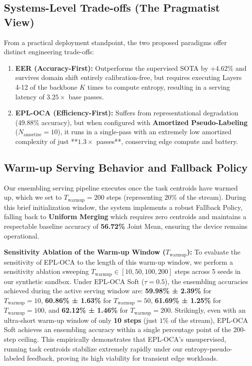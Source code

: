 \subsection{Systems-Level Trade-offs (The Pragmatist View)}
From a practical deployment standpoint, the two proposed paradigms offer distinct engineering trade-offs:
\begin{enumerate}
    \item \textbf{EER (Accuracy-First):} Outperforms the supervised SOTA by +4.62\% and survives domain shift entirely calibration-free, but requires executing Layers 4-12 of the backbone $K$ times to compute entropy, resulting in a serving latency of $3.25\times$ base passes.
    \item \textbf{EPL-OCA (Efficiency-First):} Suffers from representational degradation (49.88\% accuracy), but when configured with \textbf{Amortized Pseudo-Labeling} ($N_{\text{amortize}} = 10$), it runs in a single-pass with an extremely low amortized complexity of just **$1.3\times$ passes**, conserving edge compute and battery.
\end{enumerate}

\subsection{Warm-up Serving Behavior and Fallback Policy}
Our ensembling serving pipeline executes once the task centroids have warmed up, which we set to $T_{\text{warmup}} = 200$ steps (representing $20\%$ of the stream). During this brief initialization window, the system implements a robust Fallback Policy, falling back to \textbf{Uniform Merging} which requires zero centroids and maintains a respectable baseline accuracy of \textbf{56.72\%} Joint Mean, ensuring the device remains operational.

\textbf{Sensitivity Ablation of the Warm-up Window ($T_{\text{warmup}}$):} To evaluate the sensitivity of EPL-OCA to the length of this warm-up window, we perform a sensitivity ablation sweeping $T_{\text{warmup}} \in [10, 50, 100, 200]$ steps across 5 seeds in our synthetic sandbox. Under EPL-OCA Soft ($\tau = 0.5$), the ensembling accuracies achieved during the active serving window are: \textbf{59.98\% ± 2.39\%} for $T_{\text{warmup}} = 10$, \textbf{60.86\% ± 1.63\%} for $T_{\text{warmup}} = 50$, \textbf{61.69\% ± 1.25\%} for $T_{\text{warmup}} = 100$, and \textbf{62.12\% ± 1.46\%} for $T_{\text{warmup}} = 200$. Strikingly, even with an ultra-short warm-up window of only \textbf{10 steps} (just $1\%$ of the stream), EPL-OCA Soft achieves an ensembling accuracy within a single percentage point of the 200-step ceiling. This empirically demonstrates that EPL-OCA's unsupervised, running task centroids stabilize extremely rapidly under our entropy-pseudo-labeled feedback, proving its high viability for transient edge workloads.

